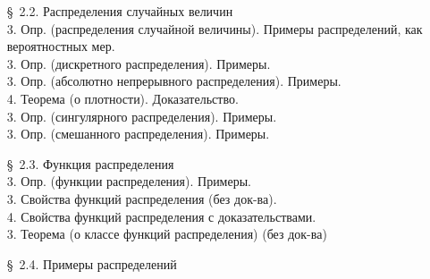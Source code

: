 \documentclass[10pt]{amsart}
\begin{document}
\begin{enumerate}
\begin{enumerate}
    
\item[\S\, 2.2.] Распределения случайных величин \\
3. Опр. (распределения случайной величины). Примеры распределений, как вероятностных мер. \\
3. Опр. (дискретного распределения). Примеры. \\
3. Опр. (абсолютно непрерывного распределения). Примеры. \\
4. Теорема (о плотности). Доказательство. \\
3. Опр. (сингулярного распределения). Примеры. \\
3. Опр. (смешанного распределения). Примеры. \\


\item[\S\, 2.3.] Функция распределения \\
    
3. Опр. (функции распределения). Примеры. \\
3. Свойства функций распределения (без док-ва). \\
4. Свойства функций распределения с доказательствами. \\
3. Теорема (о классе функций распределения) (без док-ва)\\


\item[\S\, 2.4.] Примеры распределений \\
    

\end{enumerate}
\end{enumerate}
\end{document}

